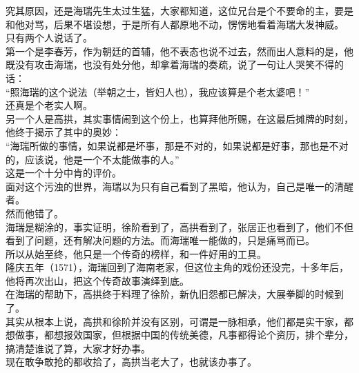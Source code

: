 \begin{multicols}{\theparacolNo}
究其原因，还是海瑞先生太过生猛，大家都知道，这位兄台是个不要命的主，要是和他对骂，后果不堪设想，于是所有人都原地不动，愣愣地看着海瑞大发神威。\\

只有两个人说话了。\\

第一个是李春芳，作为朝廷的首辅，他不表态也说不过去，然而出人意料的是，他既没有攻击海瑞，也没有处分他，却拿着海瑞的奏疏，说了一句让人哭笑不得的话：\\

“照海瑞的这个说法（举朝之士，皆妇人也），我应该算是个老太婆吧！”\\

还真是个老实人啊。\\

另一个人是高拱，其实事情闹到这个份上，也算拜他所赐，在这最后摊牌的时刻，他终于揭示了其中的奥妙：\\

“海瑞所做的事情，如果说都是坏事，那是不对的，如果说都是好事，那也是不对的，应该说，他是一个不太能做事的人。”\\

这是一个十分中肯的评价。\\

面对这个污浊的世界，海瑞以为只有自己看到了黑暗，他认为，自己是唯一的清醒者。\\

然而他错了。\\

海瑞是糊涂的，事实证明，徐阶看到了，高拱看到了，张居正也看到了，他们不但看到了问题，还有解决问题的方法。而海瑞唯一能做的，只是痛骂而已。\\

所以从始至终，他只是一个传奇的榜样，和一件好用的工具。\\

隆庆五年（1571），海瑞回到了海南老家，但这位主角的戏份还没完，十多年后，他将再次出山，把这个传奇故事演绎到底。\\

在海瑞的帮助下，高拱终于料理了徐阶，新仇旧怨都已解决，大展拳脚的时候到了。\\

其实从根本上说，高拱和徐阶并没有区别，可谓是一脉相承，他们都是实干家，都想做事，都想报效国家，但根据中国的传统美德，凡事都得论个资历，排个辈分，搞清楚谁说了算，大家才好办事。\\

现在敢争敢抢的都收拾了，高拱当老大了，也就该办事了。\\


\end{multicols}
